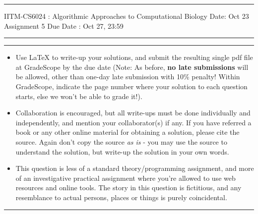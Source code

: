 \documentclass[solution,addpoints,12pt]{exam}
\begin{document}
\hrule
\vspace{3mm}
\noindent 
{\sf IITM-CS6024 : Algorithmic Approaches to Computational Biology  \hfill Date: Oct 23}
\vspace{3mm}\\
\noindent 
{\sf Assignment 5 \hfill Due Date : Oct 27, 23:59}
\vspace{3mm}
\hrule
\vspace{3mm}


\vspace{3mm}
\hrule
{\small
\begin{itemize}
    \item Use LaTeX to write-up your solutions, and submit the resulting single pdf file at GradeScope by the due date (Note: As before, {\bf no late submissions} will be allowed, other than one-day late submission with 10\% penalty! Within GradeScope, indicate the page number where your solution to each question starts, else we won't be able to grade it!). 

    \item Collaboration is encouraged, but all write-ups must be done individually and independently, and mention your collaborator(s) if any. %
    If you have referred a book or any other online material for obtaining a solution, please cite the source. Again don't copy the source {\it as is} - you may use the source to understand the solution, but write-up the solution in your own words. 

  \item This question is less of a standard theory/programming assignment, and more of an investigative practical assignment where you're allowed to use web resources and online tools. The story in this question is fictitious, and any resemblance to actual persons, places or things is purely coincidental.  
\end{itemize}}
\hrule
\end{document}
